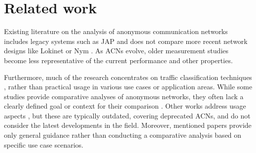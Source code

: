 \chapter{Related work}

Existing literature on the analysis of anonymous communication networks includes legacy systems such as JAP and does not compare more recent network designs like Lokinet or Nym \cite{analysis-acn-usage-jap-old, analysis-tools-usage-jap, analysis-classification-jap, analysis-phd-thesis-identification-jap, analysis-packet-momentum-identification-jap, analysis-hierarchical-traffic-classification-jap}. As ACNs evolve, older measurement studies become less representative of the current performance and other properties.

Furthermore, much of the research concentrates on traffic classification techniques \cite{analysis-classification-jap, analysis-hierarchical-traffic-classification-jap, analysis-packet-momentum-identification-jap, analysis-phd-thesis-identification-jap}, rather than practical usage in various use cases or application areas. While some studies provide comparative analyses of anonymous networks, they often lack a clearly defined goal or context for their comparison \cite{analysis-tor-vs-i2p}. Other works address usage aspects \cite{analysis-tools-usage-jap, analysis-acn-usage-jap-old}, but these are typically outdated, covering deprecated ACNs, and do not consider the latest developments in the field. Moreover, mentioned papers provide only general guidance rather than conducting a comparative analysis based on specific use case scenarios.
